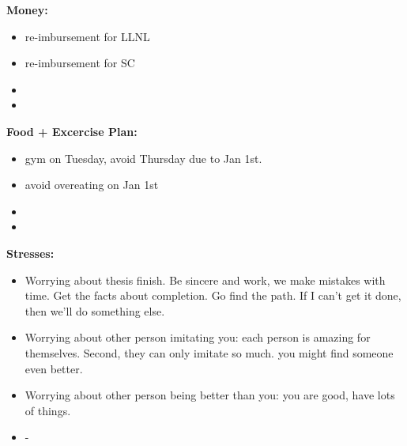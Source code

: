 \documentclass[11pt]{article}
\begin{document}
{            \textbf{Money:}\\ 

            \begin{itemize}               
              \tiny \item \tiny re-imbursement for LLNL 
            \item \tiny re-imbursement for SC 
            \item \tiny 
            \item \tiny 
              \end{itemize} 
\newline 
\newline 

            \textbf{Food + Excercise Plan:}\\
            \begin{itemize}
            \tiny \item \tiny gym on Tuesday, avoid Thursday due to Jan 1st. 
            \item \tiny avoid overeating on Jan 1st 
            \item \tiny 
              \item \tiny 
            \end{itemize}
            \textbf{Stresses:}\\
            \begin{itemize}
              \tiny \item \tiny Worrying about thesis finish. Be sincere and work, we make mistakes with time. Get the facts about completion. Go
              find the path. If I can't get it done, then we'll do something
              else.
            \item \tiny Worrying about other person imitating you: each person is amazing for themselves. Second, they can only imitate so much. you might find someone even better. 
            \item \tiny Worrying about other person being better than you: you are good, have lots of things.  
            \item \tiny -
            \end{itemize}

}
\end{document}
